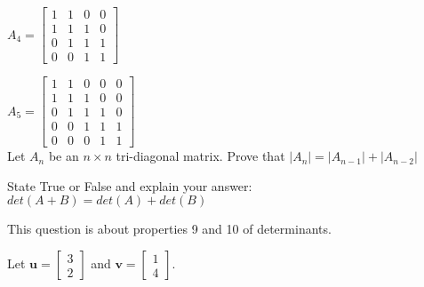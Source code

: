 \documentclass[solution,addpoints,12pt]{exam}
\begin{document}
\begin{questions}
$A_4=\begin{bmatrix}
1&1&0&0\\
1&1&1&0\\
0&1&1&1\\
0&0&1&1
\end{bmatrix}$

$A_5=\begin{bmatrix}
1&1&0&0&0\\
1&1&1&0&0\\
0&1&1&1&0\\
0&0&1&1&1\\
0&0&0&1&1
\end{bmatrix}$\\
Let $A_n$ be an $n \times n$ tri-diagonal matrix. Prove that $|A_n| = |A_{n-1}| + |A_{n-2}|$

\begin{solution}

\end{solution}

\question[1] State True or False and explain your answer: $det(A+B) = det(A) + det(B)$
\begin{solution}

\end{solution}

\question[1] This question is about properties 9 and 10 of determinants.


\question[1] Let $\mathbf{u}=\begin{bmatrix} 3 \\2 \end{bmatrix}$ and $\mathbf{v}=\begin{bmatrix} 1 \\4 \end{bmatrix}$.  
\begin{parts}

\end{parts}
\end{questions}
\end{document}
